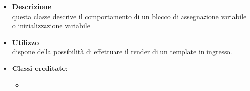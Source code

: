 \label{\nogloxy{swedesigner::server::project::ParsedStatement}}
\begin{itemize}
\item \textbf{Descrizione}\\
questa classe descrive il comportamento di un blocco di assegnazione variabile o inizializzazione variabile.	
\item \textbf{Utilizzo}\\
dispone della possibilità di effettuare il render di un template in ingresso.
\item \textbf{Classi ereditate}:
\begin{itemize}
\item \hyperref[\nogloxy{swedesigner::server::project::ParsedInstruction}]{}
\end{itemize}
\end{itemize}

